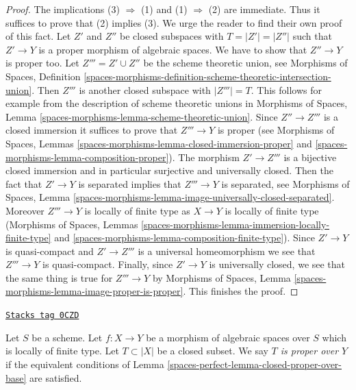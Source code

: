 \begin{proof}
The implications (3) $\Rightarrow$ (1) and (1) $\Rightarrow$ (2)
are immediate. Thus it suffices to prove that (2) implies (3).
We urge the reader to find their own proof of this fact.
Let $Z'$ and $Z''$ be closed subspaces with $T = |Z'| = |Z''|$
such that $Z' \to Y$ is a proper morphism of algebraic spaces.
We have to show that $Z'' \to Y$ is proper too.
Let $Z''' = Z' \cup Z''$ be the scheme theoretic union, see
Morphisms of Spaces, Definition
\ref{spaces-morphisms-definition-scheme-theoretic-intersection-union}.
Then $Z'''$ is another closed subspace with $|Z'''| = T$.
This follows for example from the description of scheme theoretic unions in
Morphisms of Spaces, Lemma \ref{spaces-morphisms-lemma-scheme-theoretic-union}.
Since $Z'' \to Z'''$ is a closed immersion it suffices to prove
that $Z''' \to Y$ is proper (see
Morphisms of Spaces, Lemmas
\ref{spaces-morphisms-lemma-closed-immersion-proper} and
\ref{spaces-morphisms-lemma-composition-proper}).
The morphism $Z' \to Z'''$ is a bijective closed immersion
and in particular surjective and universally closed.
Then the fact that $Z' \to Y$ is separated implies that
$Z''' \to Y$ is separated, see
Morphisms of Spaces, Lemma
\ref{spaces-morphisms-lemma-image-universally-closed-separated}.
Moreover $Z''' \to Y$ is locally of finite type
as $X \to Y$ is locally of finite type
(Morphisms of Spaces, Lemmas
\ref{spaces-morphisms-lemma-immersion-locally-finite-type} and
\ref{spaces-morphisms-lemma-composition-finite-type}).
Since $Z' \to Y$ is quasi-compact and $Z' \to Z'''$ is a
universal homeomorphism we see that $Z''' \to Y$ is quasi-compact.
Finally, since $Z' \to Y$ is universally closed, we see that
the same thing is true for $Z''' \to Y$ by
Morphisms of Spaces, Lemma \ref{spaces-morphisms-lemma-image-proper-is-proper}.
This finishes the proof.
\end{proof}

\begin{definition}
\label{spaces-perfect-definition-proper-over-base}
\href{https://stacks.math.columbia.edu/tag/0CZD}{\texttt{Stacks tag 0CZD}}

Let $S$ be a scheme.
Let $f : X \to Y$ be a morphism of algebraic spaces over $S$
which is locally of finite type.
Let $T \subset |X|$ be a closed subset.
We say {\it $T$ is proper over $Y$}
if the equivalent conditions of Lemma \ref{spaces-perfect-lemma-closed-proper-over-base}
are satisfied.
\end{definition}

